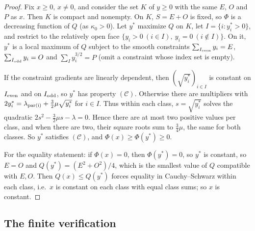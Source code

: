 \documentclass[11pt]{article}
\theoremstyle{remark}
\numberwithin{equation}{section}
\begin{document}
\begin{proof}
Fix $x\ge0$, $x\ne0$, and consider the set $K$ of $y\ge0$ with the same $E$, $O$ and $P$ as
$x$. Then $K$ is compact and nonempty. On $K$, $S=E+O$ is fixed, so $\Phi$ is a decreasing
function of $Q$ (as $\kappa_0>0$). Let $y^*$ maximize $Q$ on $K$, let
$I=\{i:y^*_i>0\}$, and restrict to the relatively open face $\{y_i>0\ (i\in I),\ y_i=0\
(i\notin I)\}$. On it, $y^*$ is a local maximum of $Q$ subject to the smooth constraints
$\sum_{I_{\rm even}}y_i=E$, $\sum_{I_{\rm odd}}y_i=O$ and $\sum_Iy_i^{3/2}=P$ (omit a
constraint whose index set is empty).

If the constraint gradients are linearly dependent, then $(\sqrt{y_i^*})_{i\in I}$ is constant on
$I_{\rm even}$ and on $I_{\rm odd}$, so $y^*$ has property $(\mathcal C)$. Otherwise there are
multipliers with $2y_i^*=\lambda_{\rm par(i)}+\frac32\mu\sqrt{y_i^*}$ for $i\in I$. Thus within
each class, $s=\sqrt{y_i^*}$ solves the quadratic $2s^2-\frac32\mu s-\lambda=0$. Hence there are
at most two positive values per class, and when there are two, their square roots sum to
$\frac34\mu$, the same for both classes. So $y^*$ satisfies $(\mathcal C)$, and
$\Phi(x)\ge\Phi(y^*)\ge0$.

For the equality statement: if $\Phi(x)=0$, then $\Phi(y^*)=0$, so $y^*$ is constant, so $E=O$
and $Q(y^*)=(E^2+O^2)/4$, which is the smallest value of $Q$ compatible with $E,O$. Then
$Q(x)\le Q(y^*)$ forces equality in Cauchy--Schwarz within each class, i.e.\ $x$ is constant on
each class with equal class sums; so $x$ is constant.
\end{proof}

\subsection{The finite verification}
\end{document}
